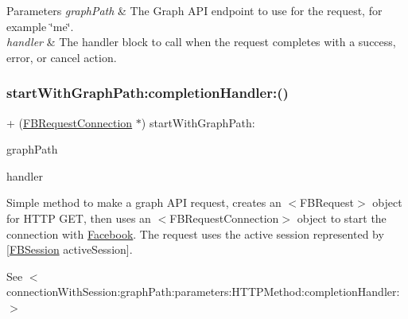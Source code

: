 \begin{DoxyParams}{Parameters}
{\em graph\+Path} & The Graph A\+PI endpoint to use for the request, for example \char`\"{}me\char`\"{}. \\
\hline
{\em handler} & The handler block to call when the request completes with a success, error, or cancel action. \\
\hline
\end{DoxyParams}
\mbox{\label{interfaceFBRequestConnection_ad5b57e64c614dcb04a71e62ee11a87d5}} 
\subsubsection{\texorpdfstring{start\+With\+Graph\+Path\+:completion\+Handler\+:()}{startWithGraphPath:completionHandler:()}\hspace{0.1cm}{\footnotesize\ttfamily [5/5]}}
{\footnotesize\ttfamily + (\hyperlink{interfaceFBRequestConnection}{F\+B\+Request\+Connection} $\ast$) start\+With\+Graph\+Path\+: \begin{DoxyParamCaption}\item[{(N\+S\+String $\ast$)}]{graph\+Path }\item[{completionHandler:(F\+B\+Request\+Handler)}]{handler }\end{DoxyParamCaption}}

Simple method to make a graph A\+PI request, creates an $<$\+F\+B\+Request$>$ object for H\+T\+TP G\+ET, then uses an $<$\+F\+B\+Request\+Connection$>$ object to start the connection with \hyperlink{interfaceFacebook}{Facebook}. The request uses the active session represented by {\ttfamily \mbox{[}\hyperlink{interfaceFBSession}{F\+B\+Session} active\+Session\mbox{]}}.

See $<$connection\+With\+Session\+:graph\+Path\+:parameters\+:\+H\+T\+T\+P\+Method\+:completion\+Handler\+:$>$


